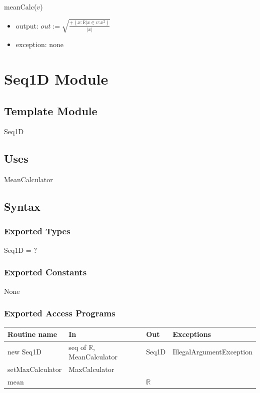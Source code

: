 \documentclass[12pt,fleqn]{examtst}
\begin{document}
meanCalc($v$)
\begin{itemize}
\item output: $\mathit{out} := \sqrt{\frac{+(x: \mathbb{R} | x \in v : x^2)}{|x|}}$
\item exception: none
\end{itemize}


\newpage

\section* {Seq1D Module}

\subsection* {Template Module}

Seq1D

\subsection* {Uses}

MeanCalculator

\subsection* {Syntax}

\subsubsection* {Exported Types}

Seq1D = ?

\subsubsection* {Exported Constants}

None

\subsubsection* {Exported Access Programs}

\begin{tabular}{| l | l | l | p{6cm} |}
\hline
\textbf{Routine name} & \textbf{In} & \textbf{Out} & \textbf{Exceptions}\\
\hline
new Seq1D & seq of $\mathbb{R}$, MeanCalculator & Seq1D & IllegalArgumentException\\
\hline
setMaxCalculator & MaxCalculator &  & \\
\hline
mean &  & $\mathbb{R}$ & \\
\hline

\end{tabular}
\end{document}
